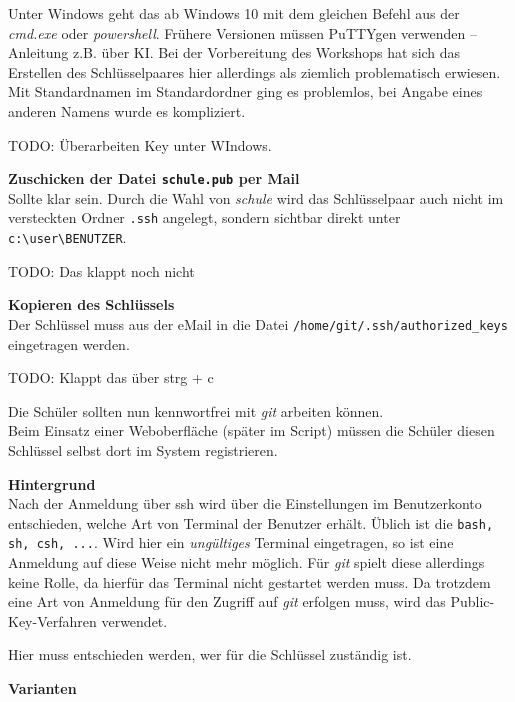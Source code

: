 \documentclass[
  letterpaper,
  DIV=11]{scrreprt}
\newcommand{\git}{\textit{git}\xspace}
\newcommand{\strg}[1]{strg + #1\xspace}
\begin{document}
Unter Windows geht das ab Windows 10 mit dem gleichen Befehl aus der
\emph{cmd.exe} oder \emph{powershell}. Frühere Versionen müssen PuTTYgen
verwenden -- Anleitung z.B. über KI. Bei der Vorbereitung des Workshops
hat sich das Erstellen des Schlüsselpaares hier allerdings als ziemlich
problematisch erwiesen. Mit Standardnamen im Standardordner ging es
problemlos, bei Angabe eines anderen Namens wurde es kompliziert.

TODO: Überarbeiten Key unter WIndows.

\textbf{Zuschicken der Datei \texttt{schule.pub} per Mail}\\
Sollte klar sein. Durch die Wahl von \emph{schule} wird das
Schlüsselpaar auch nicht im versteckten Ordner \texttt{.ssh} angelegt,
sondern sichtbar direkt unter
\texttt{c:\textbackslash{}user\textbackslash{}BENUTZER}.

TODO: Das klappt noch nicht

\textbf{Kopieren des Schlüssels}\\
Der Schlüssel muss aus der eMail in die Datei
\texttt{/home/git/.ssh/authorized\_keys} eingetragen werden.

TODO: Klappt das über \strg{c}

Die Schüler sollten nun kennwortfrei mit \git arbeiten können.\\
Beim Einsatz einer Weboberfläche (später im Script) müssen die Schüler
diesen Schlüssel selbst dort im System registrieren.

\samplestart

\textbf{Hintergrund}\\
Nach der Anmeldung über ssh wird über die Einstellungen im Benutzerkonto
entschieden, welche Art von Terminal der Benutzer erhält. Üblich ist die
\verb+bash, sh, csh, ...+. Wird hier ein \textit{ungültiges} Terminal
eingetragen, so ist eine Anmeldung auf diese Weise nicht mehr möglich.
Für \git  spielt diese allerdings keine Rolle, da hierfür das Terminal
nicht gestartet werden muss. Da trotzdem eine Art von Anmeldung für den
Zugriff auf \git  erfolgen muss, wird das Public-Key-Verfahren
verwendet.

Hier muss entschieden werden, wer für die Schlüssel zuständig ist.
\sampleend

\textbf{Varianten}
\end{document}
